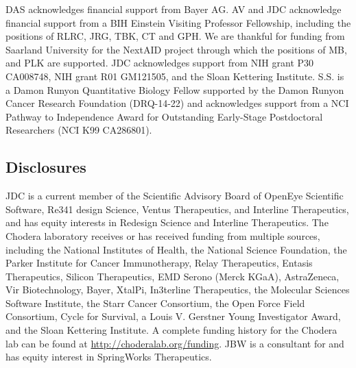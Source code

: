 \documentclass[9pt,lessons]{livecoms}
\begin{document}
DAS acknowledges financial support from Bayer AG. AV and JDC acknowledge financial support from a BIH Einstein Visiting Professor Fellowship, including the positions of RLRC, JRG, TBK, CT and GPH. We are thankful for funding from Saarland University for the NextAID project through which the positions of MB, and PLK are supported. JDC acknowledges support from NIH grant P30 CA008748, NIH grant R01 GM121505, and the Sloan Kettering Institute.  S.S. is a Damon Runyon Quantitative Biology Fellow supported by the Damon Runyon Cancer Research Foundation (DRQ-14-22) and acknowledges support from a NCI Pathway to Independence Award for Outstanding Early-Stage Postdoctoral Researchers (NCI K99 CA286801).

\subsection{Disclosures}

JDC is a current member of the Scientific Advisory Board of OpenEye Scientific Software, Re341 design Science, Ventus Therapeutics, and Interline Therapeutics, and has equity interests in Redesign Science and Interline Therapeutics. The Chodera laboratory receives or has received funding from multiple sources, including the National Institutes of Health, the National Science Foundation, the Parker Institute for Cancer Immunotherapy, Relay Therapeutics, Entasis Therapeutics, Silicon Therapeutics, EMD Serono (Merck KGaA), AstraZeneca, Vir Biotechnology, Bayer, XtalPi, In3terline Therapeutics, the Molecular Sciences Software Institute, the Starr Cancer Consortium, the Open Force Field Consortium, Cycle for Survival, a Louis V. Gerstner Young Investigator Award, and the Sloan Kettering Institute. A complete funding history for the Chodera lab can be found at
\url{http://choderalab.org/funding}. JBW is a consultant for and has equity interest in SpringWorks Therapeutics.



\nolinenumbers %

\linenumbers


\appendix
\end{document}
